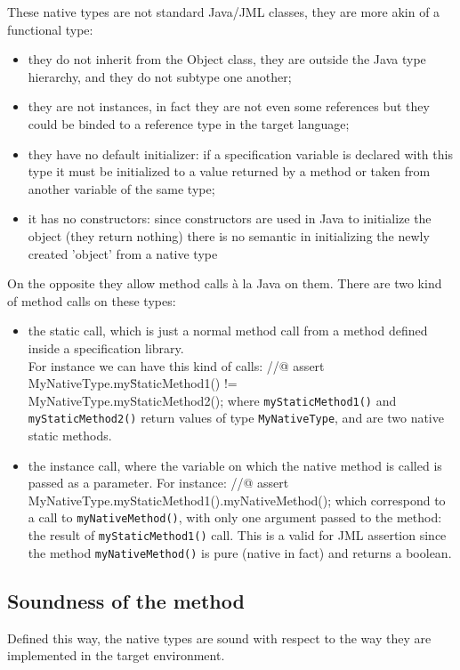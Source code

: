 These native types are not standard Java/JML classes, they are more akin of a functional type:
\begin{itemize}
\item they do not inherit from the Object class, they are outside the Java type hierarchy, and they do not
subtype one another;
\item they are not instances, in fact they are not even some references but 
they could be binded to a reference type in the target language;
\item they have no default initializer: if a specification variable is declared with this type it must
be initialized to a value returned by a method or taken from another variable of the same type;
\item it has no constructors: since constructors are used in Java to initialize the object (they return 
nothing) there is no semantic in initializing the newly created 'object' from a native type
\end{itemize}
On the opposite they allow method calls \`a la Java on them. There are two kind of method
calls on these types:
\begin {itemize}
\item the static call, which is just a normal method call from a method defined 
inside a specification library.\\
For instance we can have this kind of calls:
\btab
//@ assert MyNativeType.my\=StaticMethod1() !=\\ \>MyNativeType.myStaticMethod2();
\etab
where {\tt myStaticMethod1()} and  {\tt myStaticMethod2()} return  values of type {\tt MyNativeType}, 
and are two native static methods.
\item the instance call, where the variable on which the native method is called is passed as a 
parameter. For instance:
\btab
//@ assert MyNativeType.myStaticMethod1().myNativeMethod();
\etab
which correspond to a call to {\tt myNativeMethod()}, with only one argument passed to the method: the
result of {\tt myStaticMethod1()} call. This is a valid for JML assertion since the method 
{\tt myNativeMethod()} is
pure (native in fact) and returns a boolean.
\end{itemize}
\subsection{Soundness of the method}
Defined this way, the native types are sound with respect to the way they are implemented in the 
target environment. 

